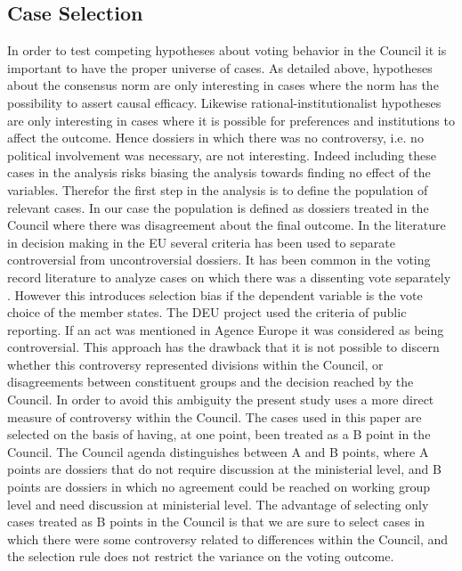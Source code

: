 \subsection{Case Selection}

In order to test competing hypotheses about voting behavior in the Council it is important to have the proper universe of cases. As detailed above, hypotheses about the consensus norm are only interesting in cases where the norm has the possibility to assert causal efficacy. Likewise rational-institutionalist hypotheses are only interesting in cases where it is possible for preferences and institutions to affect the outcome. Hence dossiers in which there was no controversy, i.e. no political involvement was necessary, are not interesting. Indeed including these cases in the analysis risks biasing the analysis towards finding no effect of the variables. Therefor the first step in the analysis is to define the population of relevant cases. In our case the population is defined as dossiers treated in the Council where there was disagreement about the final outcome. In the literature in decision making in the EU several criteria has been used to separate controversial from uncontroversial dossiers. It has been common in the voting record literature to analyze cases on which there was a dissenting vote separately \citep{Heisenberg2005,Hayes-renshaw2006,Hagemann2008}. However this introduces selection bias if the dependent variable is the vote choice of the member states. The DEU project \citep{Thomson2006a} used the criteria of public reporting. If an act was mentioned in Agence Europe it was considered as being controversial. This approach has the drawback that it is not possible to discern whether this controversy represented divisions within the Council, or disagreements between constituent groups and the decision reached by the Council. In order to avoid this ambiguity the present study uses a more direct measure of controversy within the Council. The cases used in this paper are selected on the basis of having, at one point, been treated as a B point in the Council. The Council agenda distinguishes between A and B points, where A points are dossiers that do not require discussion at the ministerial level, and B points are dossiers in which no agreement could be reached on working group level and need discussion at ministerial level. The advantage of selecting only cases treated as B points in the Council is that we are sure to select cases in which there were some controversy related to differences within the Council, and the selection rule does not restrict the variance on the voting outcome. 

